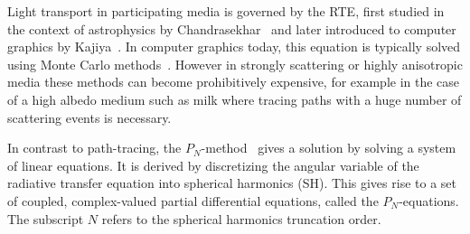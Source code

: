 \documentclass{egpubl}
\begin{document}
Light transport in participating media is governed by the RTE, first studied in the context of astrophysics by Chandrasekhar~\cite{Chandrasekhar60} and later introduced to computer graphics by Kajiya~\cite{Kajiya86}. In computer graphics today, this equation is typically solved using Monte Carlo methods~\cite{Novak18}. However in strongly scattering or highly anisotropic media these methods can become prohibitively expensive, for example in the case of a high albedo medium such as milk where tracing paths with a huge number of scattering events is necessary.

In contrast to path-tracing, the $P_N$-method~\cite{Brunner02} gives a solution by solving a system of linear equations. It is derived by discretizing the angular variable of the radiative transfer equation into spherical harmonics (SH). This gives rise to a set of coupled, complex-valued partial differential equations, called the $P_N$-equations. The subscript $N$ refers to the spherical harmonics truncation order.
\end{document}
